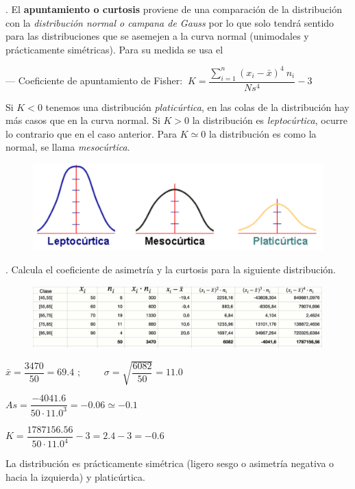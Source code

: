 \vspace{5mm}%
\begin{definition}
	. El \textbf{apuntamiento o curtosis} proviene de una comparación de la distribución con la \emph{distribución normal o campana de Gauss} por lo que solo tendrá sentido para las distribuciones que se asemejen a la curva normal (unimodales y prácticamente simétricas). Para su medida se usa el
	
	\vspace{2mm} --- Coeficiente de apuntamiento de Fisher: $\ K=\dfrac{\displaystyle \sum_{i=1}^n (x_i-\bar x)^4 \ n_i}{Ns^4}-3$
	
	\vspace{4mm} Si $K<0$ tenemos una distribución \emph{platicúrtica}, en las colas de la distribución hay más casos que en la curva normal. Si $K>0$ la distribución es \emph{leptocúrtica}, ocurre lo contrario que en el caso anterior. Para $K\simeq 0$ la distribución es como la normal, se llama \emph{mesocúrtica}.
	
	\begin{figure}[H]
			\centering
			\includegraphics[width=.75\textwidth]{imagenes/imagenes01/T01IM19.png}
	\end{figure}
	
	\end{definition}

\vspace{5mm}%
\begin{example}
	. Calcula el coeficiente de asimetría y la curtosis para la siguiente distribución.
	
	\begin{figure}[H]
			\centering
			\includegraphics[width=1\textwidth]{imagenes/imagenes01/T01IM20.png}
	\end{figure}
	
	
	$\bar x=\dfrac{3470}{50}=69.4$ $;\qquad$ $\sigma=\sqrt{\dfrac{6082}{50}}=11.0$
	
	$As=\dfrac{-4041.6}{50\cdot 11.0^3}=-0.06\simeq -0.1$
	
	$K=\dfrac{1787156.56}{50\cdot 11.0^4}-3=2.4-3=-0.6$	
	

\vspace{2mm}La distribución es prácticamente simétrica (ligero sesgo o asimetría negativa o hacia la izquierda) y platicúrtica.
		
\end{example}

